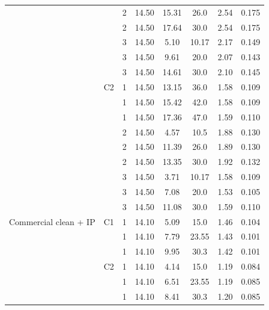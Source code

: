 {\begin{longtable}{llcccccc}
   &  & 2 & 14.50 & 15.31 & 26.0 & 2.54 & 0.175 \\
   &  & 2 & 14.50 & 17.64 & 30.0 & 2.54 & 0.175 \\
   &  & 3 & 14.50 & 5.10 & 10.17 & 2.17 & 0.149 \\
   &  & 3 & 14.50 & 9.61 & 20.0 & 2.07 & 0.143 \\
   &  & 3 & 14.50 & 14.61 & 30.0 & 2.10 & 0.145 \\
  \addlinespace[2pt]
   & C2 & 1 & 14.50 & 13.15 & 36.0 & 1.58 & 0.109 \\
   &  & 1 & 14.50 & 15.42 & 42.0 & 1.58 & 0.109 \\
   &  & 1 & 14.50 & 17.36 & 47.0 & 1.59 & 0.110 \\
   &  & 2 & 14.50 & 4.57 & 10.5 & 1.88 & 0.130 \\
   &  & 2 & 14.50 & 11.39 & 26.0 & 1.89 & 0.130 \\
   &  & 2 & 14.50 & 13.35 & 30.0 & 1.92 & 0.132 \\
   &  & 3 & 14.50 & 3.71 & 10.17 & 1.58 & 0.109 \\
   &  & 3 & 14.50 & 7.08 & 20.0 & 1.53 & 0.105 \\
   &  & 3 & 14.50 & 11.08 & 30.0 & 1.59 & 0.110 \\
  \midrule
  Commercial clean + IP & C1 & 1 & 14.10 & 5.09 & 15.0 & 1.46 & 0.104 \\
   &  & 1 & 14.10 & 7.79 & 23.55 & 1.43 & 0.101 \\
   &  & 1 & 14.10 & 9.95 & 30.3 & 1.42 & 0.101 \\
  \addlinespace[2pt]
   & C2 & 1 & 14.10 & 4.14 & 15.0 & 1.19 & 0.084 \\
   &  & 1 & 14.10 & 6.51 & 23.55 & 1.19 & 0.085 \\
   &  & 1 & 14.10 & 8.41 & 30.3 & 1.20 & 0.085 \\
\end{longtable}}


